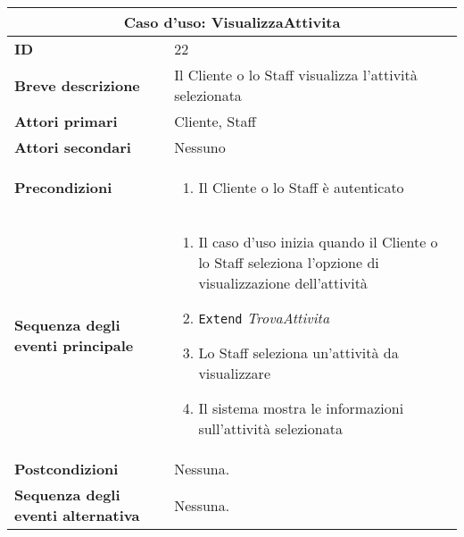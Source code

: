 \documentclass[a4paper]{report}
\begin{document}
\clearpage
\begin{table}[H]
\vspace*{-0cm}
\renewcommand{\arraystretch}{1.9}
\begin{tabular}{|p{3.9cm}|p{9.9cm}|}
\hline
\multicolumn{2}{|c|}{\textbf{Caso d’uso: VisualizzaAttivita}} \\ \hline
	\textbf{ID} & 22 \\ \hline
	\textbf{Breve descrizione} & Il Cliente o lo Staff visualizza l’attività selezionata \\ \hline
	\textbf{Attori primari} & Cliente, Staff \\ \hline
	\textbf{Attori secondari} & Nessuno \\ \hline
	\textbf{Precondizioni} & \begin{enumerate}[leftmargin=14pt,label=\arabic*.,labelsep=0.5em,topsep=0pt,partopsep=0pt,parsep=0pt,itemsep=0pt]
    \item Il Cliente o lo Staff è autenticato
\end{enumerate} \\ \hline
	\textbf{Sequenza degli eventi principale} & \begin{enumerate}[leftmargin=14pt,label=\arabic*.,labelsep=0.5em,topsep=0pt,partopsep=0pt,parsep=0pt,itemsep=0pt]
    \item Il caso d’uso inizia quando il Cliente o lo Staff seleziona l’opzione di visualizzazione  dell'attività
    \item \texttt{Extend} \textit{TrovaAttivita}
    \item Lo Staff seleziona un’attività da visualizzare
    \item Il sistema mostra le informazioni sull’attività selezionata
\end{enumerate} \\ \hline
	\textbf{Postcondizioni} & Nessuna. \\ \hline
	\textbf{Sequenza degli eventi alternativa} & Nessuna. \\ \hline
\end{tabular}
\end{table}
\end{document}
